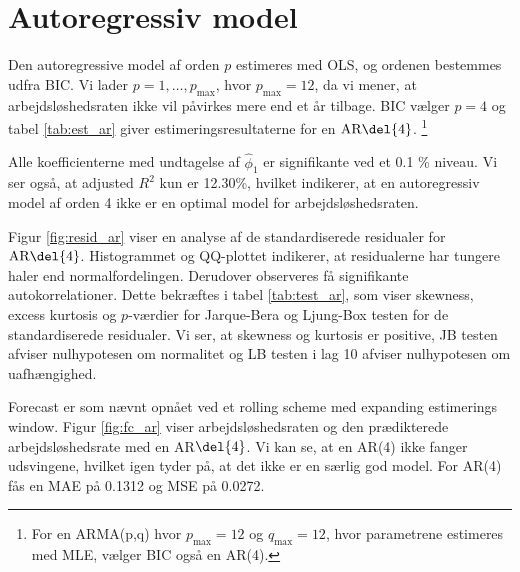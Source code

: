 \section{Autoregressiv model}
Den autoregressive model af orden \(p\) estimeres med OLS, og ordenen bestemmes udfra BIC.
Vi lader $p = 1, \ldots, p_{\max}$, hvor \(p_\text{max}=12\), da vi mener, at arbejdsløshedsraten ikke vil påvirkes mere end et år tilbage.
BIC vælger \(p=4\) og tabel \ref{tab:est_ar} giver estimeringsresultaterne for en \(\text{AR} \del{4}\). \footnote{For en ARMA(p,q) hvor $p_{\max} = 12$ og $q_{\max} = 12$, hvor parametrene estimeres med MLE, vælger BIC også en AR(4).}
%


Alle koefficienterne med undtagelse af $\widehat\phi_1$ er signifikante ved et 0.1 \% niveau. 
Vi ser også, at adjusted $R^2$ kun er 12.30\%, hvilket indikerer, at en autoregressiv model af orden 4 ikke er en optimal model for arbejdsløshedsraten. 



Figur \ref{fig:resid_ar} viser en analyse af de standardiserede residualer for \(\text{AR} \del{4}\). 
Histogrammet og QQ-plottet indikerer, at residualerne har tungere haler end normalfordelingen. 
Derudover observeres få signifikante autokorrelationer.
Dette bekræftes i tabel \ref{tab:test_ar}, som viser skewness, excess kurtosis og \(p\)-værdier for Jarque-Bera og Ljung-Box testen for de standardiserede residualer. 
Vi ser, at skewness og kurtosis er positive, JB testen afviser nulhypotesen om normalitet og LB testen i lag 10 afviser nulhypotesen om uafhængighed.


Forecast er som nævnt opnået ved et rolling scheme med expanding estimerings window. 
Figur \ref{fig:fc_ar} viser arbejdsløshedsraten og den prædikterede arbejdsløshedsrate med en AR\(\del{4}\).
Vi kan se, at en AR(4) ikke fanger udsvingene, hvilket igen tyder på, at det ikke er en særlig god model. 
For AR(4) fås en MAE på 0.1312 og MSE på 0.0272.
%

\newpage
